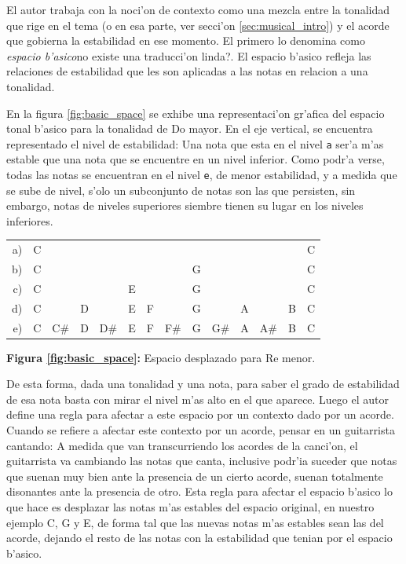 El autor trabaja con la noci'on de contexto como una mezcla entre la tonalidad que rige en el tema (o en esa parte, ver secci'on \ref{sec:musical_intro}) y el
acorde que gobierna la estabilidad en ese momento. El primero lo denomina como \emph{espacio b'asico}\alert{no existe una traducci'on linda?}. 
El espacio b'asico refleja las relaciones de estabilidad que les son aplicadas a las notas en relacion a una tonalidad. 

En la figura \ref{fig:basic_space} se exhibe una representaci'on gr'afica del espacio tonal b'asico para la tonalidad de Do mayor. En el eje vertical, se encuentra
representado el nivel de estabilidad: Una nota que esta en el nivel \texttt{a} ser'a m'as estable que una nota que se encuentre en un nivel inferior. Como 
podr'a verse, todas las notas se encuentran en el nivel \texttt{e}, de menor estabilidad, y a medida que se sube de nivel, s'olo un subconjunto de notas son las 
que persisten, sin embargo, notas de niveles superiores siembre tienen su lugar en los niveles inferiores.

\begin{center}
\begin{tabular}{r c c c c c c c c c c c c c} 
\label{fig:basic_space}
a) & C &     &   &     &   &   &     &   &     &   &     &   & C\\
b) & C &     &   &     &   &   &     & G &     &   &     &   & C\\
c) & C &     &   &     & E &   &     & G &     &   &     &   & C\\
d) & C &     & D &     & E & F &     & G &     & A &     & B & C\\
e) & C & C\# & D & D\# & E & F & F\# & G & G\# & A & A\# & B & C\\
\end{tabular}
\newline
\textbf{Figura \ref{fig:basic_space}:} Espacio desplazado para Re menor.
\end{center}


De esta forma, dada una tonalidad y una nota, para saber el grado de estabilidad de esa nota basta con mirar el nivel m'as alto en el que aparece.
Luego el autor define una regla para afectar a este espacio por un contexto dado por un acorde. Cuando se refiere a afectar este contexto por un acorde, pensar
en un guitarrista cantando: A medida que van transcurriendo los acordes de la canci'on, el guitarrista va cambiando las notas que canta, inclusive podr'ia
suceder que notas que suenan muy bien ante la presencia de un cierto acorde, suenan totalmente disonantes ante la presencia de otro. 
Esta regla para afectar el espacio b'asico lo que hace es desplazar las notas m'as estables del espacio original, en nuestro ejemplo C, G y E, de forma tal
que las nuevas notas m'as estables sean las del acorde, dejando el resto de las notas con la estabilidad que tenian por el espacio b'asico. 

